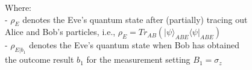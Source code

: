\documentclass{beamer}
\begin{document}
\begin{frame}
\begin{itemize}
\begin{itemize}
\begin{itemize}
                    \vspace{1ex}
                    \footnotesize Where:\\
                    - ${\rho}_{E}$ denotes the Eve's quantum state after (partially) tracing out\\\hspace{0.5em}Alice and Bob's particles, i.e., ${\rho}_{E} = {Tr}_{AB}\left({|\psi\rangle}_{ABE}{\langle\psi|}_{ABE}\right)$\\
                    - ${\rho}_{E|{b}_{1}}$ denotes the Eve's quantum state when Bob has obtained\\\hspace{0.5em}the outcome result ${b}_{1}$ for the measurement setting ${B}_{1} = {\sigma}_{z}$
                 \end{itemize}
            \end{itemize}
        \end{itemize}
    \end{frame}
\end{document}
